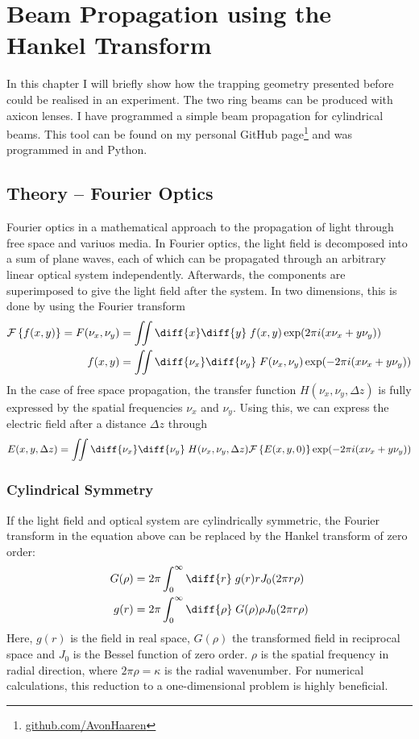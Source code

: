 

\chapter{Beam Propagation using the Hankel Transform}

In this chapter I will briefly show how the trapping geometry presented before could be realised in an experiment.
The two ring beams can be produced with axicon lenses. I have programmed a simple beam propagation for cylindrical beams. This tool can be found on my personal GitHub page\footnote{\url{github.com/AvonHaaren}} and was programmed in \Cpp and Python.

\section{Theory -- Fourier Optics}
Fourier optics in a mathematical approach to the propagation of light through free space and variuos media. In Fourier optics, the light field is decomposed into a sum of plane waves, each of which can be propagated through an arbitrary linear optical system independently. Afterwards, the components are superimposed to give the light field after the system. In two dimensions, this is done by using the Fourier transform
\begin{align}
    \mathcal{F}\left\{f(x,y)\right\} = F(\nu_x,\nu_y) &= \iint \diff{x} \diff{y}\; f(x,y) \exp\!\left(2\pi i (x\nu_x + y\nu_y)\right) \\
    f(x,y) &= \iint \diff{\nu_x} \diff{\nu_y}\; F(\nu_x,\nu_y) \exp\!\left(-2\pi i (x\nu_x + y\nu_y)\right)
\end{align}
In the case of free space propagation, the transfer function $H(\nu_x,\nu_y,\Delta z)$ is fully expressed by the spatial frequencies $\nu_x$ and $\nu_y$. Using this, we can express the electric field after a distance $\Delta z$ through
\begin{align}
    E(x,y,\Delta z) = \iint \diff{\nu_x} \diff{\nu_y}\; H(\nu_x,\nu_y,\Delta z) \mathcal{F}\left\{E(x,y,0)\right\} \exp\!\left(-2\pi i (x\nu_x + y\nu_y)\right)
\end{align}

\subsection{Cylindrical Symmetry}
If the light field and optical system are cylindrically symmetric, the Fourier transform in the equation above can be replaced by the Hankel transform of zero order:
\begin{align}
    G(\rho) &= 2\pi\int_0^\infty \diff{r}\; g(r) r J_0(2\pi r \rho) \\
    g(r) &= 2\pi \int_0^\infty \diff{\rho}\; G(\rho) \rho J_0(2\pi r \rho)
\end{align}
Here, $g(r)$ is the field in real space, $G(\rho)$ the transformed field in reciprocal space and $J_0$ is the Bessel function of zero order. $\rho$ is the spatial frequency in radial direction, where $2\pi\rho = \kappa$ is the radial wavenumber. For numerical calculations, this reduction to a one-dimensional problem is highly beneficial.

